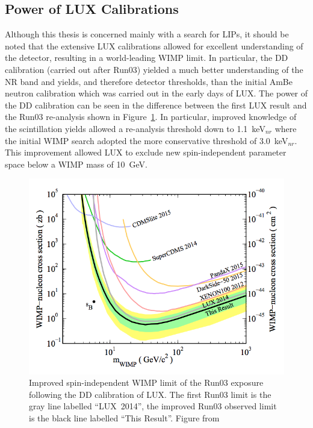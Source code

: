 \subsection{Power of LUX Calibrations}
Although this thesis is concerned mainly with a search for \ac{LIP}s, it should be noted that the extensive \ac{LUX} calibrations allowed for excellent understanding of the detector, resulting in a world-leading \ac{WIMP} limit. In particular, the \ac{DD} calibration (carried out after Run03) yielded a much better understanding of the \ac{NR} band and yields, and therefore detector thresholds, than the initial \ac{AmBe} neutron calibration which was carried out in the early days of \ac{LUX}. The power of the \ac{DD} calibration can be seen in the difference between the first \ac{LUX} result \cite{LUXFirstResults} and the Run03 re-analysis \cite{LUXReanalysis} shown in Figure~\ref{fig:lux_reanalysis}. In particular, improved knowledge of the scintillation yields allowed a re-analysis threshold down to 1.1~keV$_{nr}$ where the initial \ac{WIMP} search adopted the more conservative threshold of 3.0~keV$_{nr}$. This improvement allowed \ac{LUX} to exclude new spin-independent parameter space below a \ac{WIMP} mass of 10~GeV. 


\begin{figure}[htbp]
\begin{center}
\includegraphics[width=\textwidth]{figures/lux/lux_reanalysis.png}
\caption{Improved spin-independent \ac{WIMP} limit of the Run03 exposure following the \ac{DD} calibration of \ac{LUX}. The first Run03 limit is the gray line labelled ``LUX~2014'', the improved Run03 observed limit is the black line labelled ``This Result''.  Figure from \cite{LUXReanalysis}}
\label{fig:lux_reanalysis}
\end{center}
\end{figure}




